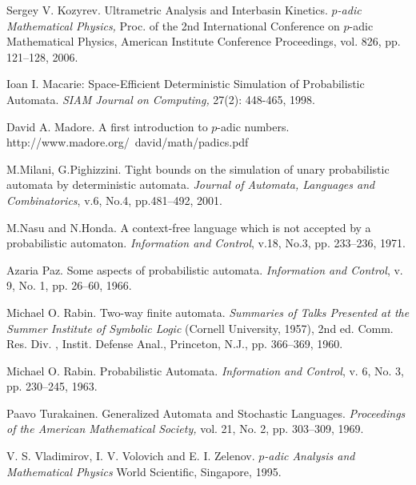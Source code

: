 \documentclass{llncs}
\begin{document}
\begin{thebibliography}{99}
Sergey V. Kozyrev. 
Ultrametric Analysis and Interbasin Kinetics.
{\em $p$-adic Mathematical Physics,} Proc. of the 2nd International Conference on $p$-adic 
Mathematical Physics, American Institute Conference Proceedings,
vol. 826, pp. 121--128, 2006.


Ioan I. Macarie: 
Space-Efficient Deterministic Simulation of Probabilistic Automata. 
{\em SIAM Journal on Computing,} 27(2): 448-465, 1998.

David A. Madore.
A first introduction to $p$-adic numbers.
http://www.madore.org/~david/math/padics.pdf 



M.Milani, G.Pighizzini.
Tight bounds on the simulation of unary probabilistic automata
by deterministic automata.
\textit{Journal of Automata, Languages and Combinatorics}, v.6, No.4, pp.481--492, 2001.


M.Nasu and N.Honda.
A context-free language which is not accepted by a probabilistic automaton.
\textit {Information and Control}, v.18, No.3, pp. 233--236, 1971.

Azaria Paz.
Some aspects of probabilistic automata.
\textit {Information and Control}, v. 9, No. 1, pp. 26--60, 1966.

Michael O. Rabin.
Two-way finite automata.
{\em Summaries of Talks Presented at the Summer Institute of Symbolic Logic}
(Cornell University, 1957), 2nd ed. Comm. Res. Div. , Instit. Defense Anal., Princeton, N.J., pp. 366--369, 1960.

Michael O. Rabin.
Probabilistic Automata.
\textit{Information and Control}, v. 6, No. 3, pp. 230--245, 1963.



Paavo Turakainen.
Generalized Automata and Stochastic Languages.
{\em Proceedings of the American Mathematical Society,} vol. 21, No. 2, pp. 303--309, 1969.


V. S. Vladimirov, I. V. Volovich and E. I. Zelenov.
{\em $p$-adic Analysis and Mathematical Physics} 
World Scientific, Singapore, 1995. 

\end{thebibliography}
\end{document}
